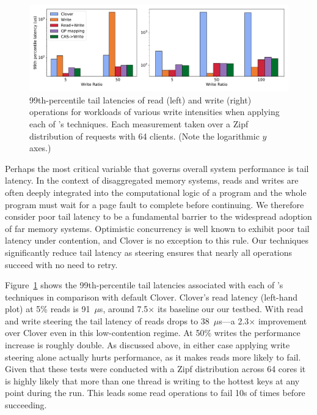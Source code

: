 \begin{figure}
    \includegraphics[width=1.0\textwidth]{fig/99th_latency.pdf}

    \caption{99th-percentile tail latencies of read (left) and write
      (right) operations for workloads of various write intensities
      when applying each of {\sword}'s techniques.  Each measurement
      taken over a Zipf distribution of requests with 64
      clients. (Note the logarithmic $y$ axes.)}

    \label{fig:tail_latency}
\end{figure}

Perhaps the most critical variable that governs overall system
performance is tail latency. In the context of disaggregated memory
systems, reads and writes are often deeply integrated into the
computational logic of a program and the whole program must wait for a
page fault to complete before continuing. We therefore consider poor
tail latency to be a fundamental barrier to the widespread adoption of
far memory systems.  Optimistic concurrency is well known to exhibit
poor tail latency under contention, and Clover is no exception to this
rule. Our techniques significantly reduce tail latency as steering
ensures that nearly all operations succeed with no need to retry.

Figure~\ref{fig:tail_latency} shows the 99th-percentile tail latencies
associated with each of \sword's techniques in comparison with default
Clover. Clover's read latency (left-hand plot) at 5\% reads is
91~$\mu$s, around 7.5$\times$ its baseline our our testbed. With read
and write steering the tail latency of reads drops to 38~$\mu$s---a
2.3$\times$ improvement over Clover even in this low-contention
regime. At 50\% writes the performance increase is roughly double.  As
discussed above, in either case applying write steering alone actually
hurts performance, as it makes reads more likely to fail.
Given that these tests were conducted with a
Zipf distribution across 64 cores it is highly likely that more than
one thread is writing to the hottest keys at any point during the
run. This leads some read operations to fail 10s of times before
succeeding.

